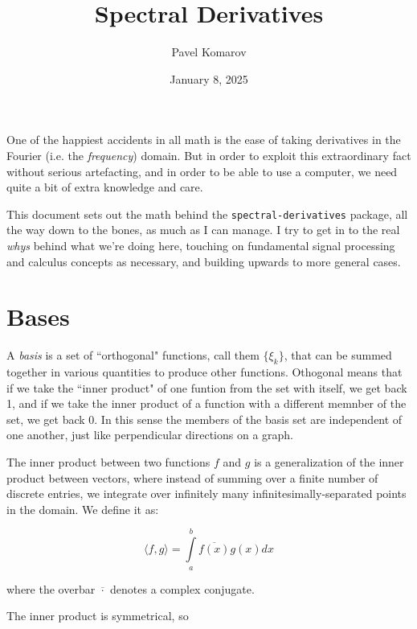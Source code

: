 \documentclass[10pt]{article}
\begin{document}
\allowdisplaybreaks

\title{Spectral Derivatives}
\author{Pavel Komarov}
\date{January 8, 2025}
\maketitle

One of the happiest accidents in all math is the ease of taking derivatives in the Fourier (i.e. the \textit{frequency}) domain. But in order to exploit this extraordinary fact without serious artefacting, and in order to be able to use a computer, we need quite a bit of extra knowledge and care.

This document sets out the math behind the \texttt{spectral-derivatives} package, all the way down to the bones, as much as I can manage. I try to get in to the real \textit{whys} behind what we're doing here, touching on fundamental signal processing and calculus concepts as necessary, and building upwards to more general cases.

\tableofcontents
\pagebreak

\section{Bases}

A \textit{basis} is a set of ``orthogonal" functions, call them $\{\xi_k\}$, that can be summed together in various quantities to produce other functions. Othogonal means that if we take the ``inner product" of one funtion from the set with itself, we get back 1, and if we take the inner product of a function with a different memnber of the set, we get back 0. In this sense the members of the basis set are independent of one another, just like perpendicular directions on a graph.

The inner product between two functions $f$ and $g$ is a generalization of the inner product between vectors, where instead of summing over a finite number of discrete entries, we integrate over infinitely many infinitesimally-separated points in the domain. We define it as:

$$ \langle f,g \rangle = \int\limits_{a}^{b} \overline{f(x)} g(x) dx $$

where the overbar $\overline{\cdot}$ denotes a complex conjugate.\newline

The inner product is symmetrical, so
\end{document}
